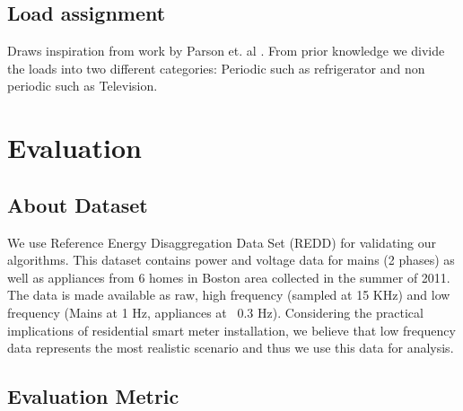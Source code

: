 \documentclass[conference]{IEEEtran}
\newcommand{\figref}[1]{Figure~\ref{#1}}
\begin{document}
\subsection{Load assignment}
Draws inspiration from work by Parson et. al \cite{parson2012_aaai}. From prior knowledge we divide the loads into two different categories: Periodic such as refrigerator and non periodic such as Television.

\section{Evaluation}
\subsection{About Dataset}

We use Reference Energy Disaggregation Data Set (REDD) \cite{redd} for validating our algorithms. This dataset contains power and voltage data for mains (2 phases) as well as appliances from 6 homes in Boston area collected in the summer of 2011. The data is made available as raw, high frequency (sampled at 15 KHz) and low frequency (Mains at 1 Hz, appliances at ~0.3 Hz). Considering the practical implications of residential smart meter installation, we believe that low frequency data represents the most realistic scenario and thus we use this data for analysis. 



%	
%
\subsection{Evaluation Metric}
\end{document}
